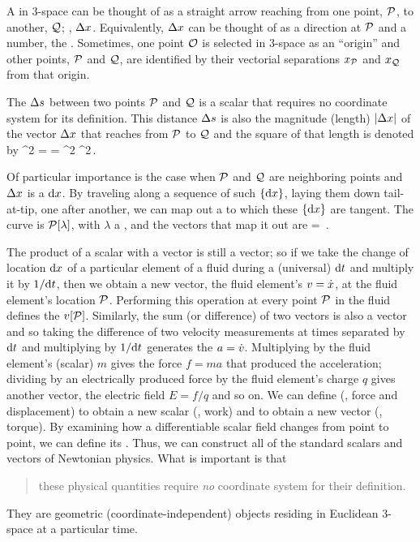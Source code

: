 A  in 3-space can be thought of as a straight arrow reaching from one point, $\mathcal{P}$, to another, $\mathcal{Q}$; \ie, $\Delta x$. Equivalently, $\Delta x$ can be thought of as a direction at $\mathcal{P}$ and a number, the . Sometimes, one point $\mathcal{O}$ is selected in 3-space as an ``origin'' and other points, $\mathcal{P}$ and $\mathcal{Q}$, are identified by their vectorial separations $x_{\mathcal{P}}$ and $x_{\mathcal{Q}}$ from that origin.

The  $\Delta s$ between two points $\mathcal{P}$ and $\mathcal{Q}$ is a scalar that requires no coordinate system for its definition. This distance $\Delta s$ is also the magnitude (length) $\lvert{\Delta x}\rvert$ of the vector $\Delta x$ that reaches from $\mathcal{P}$ to $\mathcal{Q}$ and the square of that length is denoted by
\beq
\magn{\diff\pvec}^2 = \diff\pvec\diff\pvec = \diff\pvec^2  \diff\svec^2\,.
\eeq

Of particular importance is the case when $\mathcal{P}$ and $\mathcal{Q}$ are neighboring points and $\Delta x$ is a  $\text{d}x$. By traveling along a sequence of such $\left\lbrace{\text{d}x}\right\rbrace$, laying them down tail-at-tip, one after another, we can map out a  to which these $\left\lbrace{\text{d}x}\right\rbrace$ are tangent. The curve is $\mathcal{P}\!\left[{\lambda}\right]$, with $\lambda$ a , and the vectors that map it out are 
\beq
\dx\pvec = \dx\lambda\,.
\eeq

The product of a scalar with a vector is still a vector; so if we take the change of location $\text{d}x$ of a particular element of a fluid during a (universal)  $\text{d} t$ and multiply it by $1/\text{d} t$, then we obtain a new vector, the fluid element's  $v = \dot{x}$, at the fluid element's location $\mathcal{P}$. Performing this operation at every point $\mathcal{P}$ in the fluid defines the  $v\!\left[{\mathcal{P}}\right]$. Similarly, the sum (or difference) of two vectors is also a vector and so taking the difference of two velocity measurements at times separated by $\text{d} t$ and multiplying by $1/\text{d} t$ generates the  $a = \dot{v}$. Multiplying by the fluid element's (scalar)  $m$ gives the force $f = ma$ that produced the acceleration; dividing by an electrically produced force by the fluid element's charge $q$ gives another vector, the electric field $E = f/q$ and so on. We can define  (\eg, force and displacement) to obtain a new scalar (\eg, work) and  to obtain a new vector (\eg, torque). By examining how a differentiable scalar field changes from point to point, we can define its . Thus, we can construct all of the standard scalars and vectors of Newtonian physics. What is important is that
\begin{quote}
these physical quantities require \emph{no} coordinate system for their definition.
\end{quote}
They are geometric (coordinate-independent) objects residing in Euclidean 3-space at a particular time.

